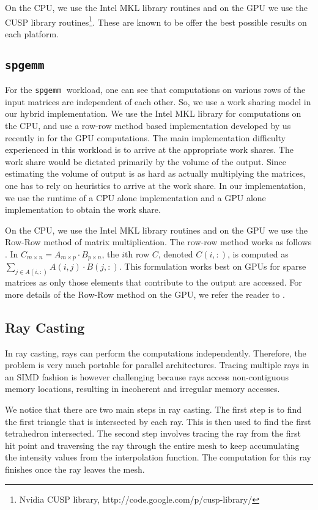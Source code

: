 \documentclass[11pt]{article}
\newcommand{\sgemm} {{\tt spgemm}}
\begin{document}
On the CPU, we use the Intel MKL \cite{mkl} library routines and on the GPU we use
the CUSP library routines\footnote{Nvidia CUSP library,
http://code.google.com/p/cusp-library/}. These are known to be offer the best possible
results on each platform.

\subsection{\sgemm}
For the \sgemm$\;$ workload, one can see that computations on various rows of
the input matrices are independent of each other. So, we use a work sharing
model in our hybrid implementation. We use the Intel MKL library \cite{mkl}
for computations on the CPU, and use a row-row method based implementation
developed by us recently in \cite{sgemm} for the GPU computations. The main
implementation difficulty experienced in this workload is to arrive at the
appropriate work shares. The work share would be dictated primarily by the
volume of the output. Since estimating the volume of output is as hard as
actually multiplying the matrices, one has to rely on heuristics to arrive at
the work share. In our implementation, we use the runtime of a CPU alone
implementation and a GPU alone implementation to obtain the work share. 

On the CPU, we use the Intel MKL \cite{mkl} library routines and on the GPU we use
the Row-Row method of matrix multiplication. The row-row method works as
follows \cite{sgemm}. In $C_{m\times n} = A_{m\times p} \cdot
B_{p \times n}$, the $i$th row $C$, denoted $C(i, :)$, is computed as
$\sum_{j \in A(i,:)} A(i, j)\cdot B(j, :)$. This formulation works best
on GPUs for sparse matrices as only those elements that contribute to
the output are  accessed. For more details of the Row-Row method on the
GPU, we refer the reader to \cite{sgemm}.

\subsection{Ray Casting}
In ray casting, rays can perform the computations independently. Therefore,
the problem is very much portable for parallel architectures. Tracing
multiple rays in an SIMD fashion is however challenging because rays access non-contiguous
memory locations, resulting in incoherent and irregular memory accesses.

We notice that there are two main steps in ray casting. The first step is to
find the first triangle that is intersected by each ray. This is then used to
find the first tetrahedron intersected. The second step involves tracing the
ray from the first hit point and traversing the ray through the entire mesh to keep
accumulating the intensity values from the interpolation function. The computation
for this ray finishes  once the ray leaves the mesh. 
\end{document}
